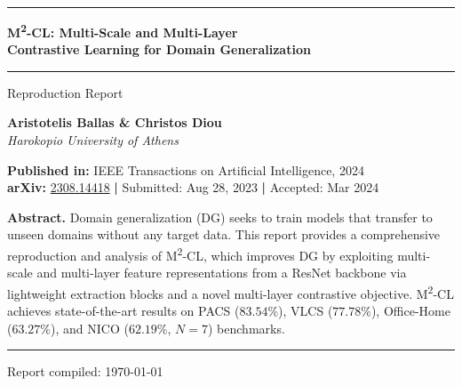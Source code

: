 \documentclass[12pt,a4paper]{article}
\begin{document}

\begin{titlepage}
  \centering
  \vspace*{1.5cm}

  {\color{DarkBlue}\rule{\textwidth}{2pt}}
  \vspace{0.5cm}

  {\huge\bfseries\color{DarkBlue}
    M\textsuperscript{2}-CL: Multi-Scale and Multi-Layer\\[6pt]
    Contrastive Learning for Domain Generalization}

  \vspace{0.3cm}
  {\color{MidBlue}\rule{\textwidth}{1pt}}

  \vspace{0.8cm}
  {\large\color{DarkGray} Reproduction Report}

  \vspace{1.2cm}

  {\large\bfseries Aristotelis Ballas \quad \& \quad Christos Diou}\\[4pt]
  {\normalsize\itshape Harokopio University of Athens}

  \vspace{1.2cm}

  \begin{tcolorbox}[width=0.82\textwidth,
    colback=LightBlue!25,colframe=MidBlue,
    left=10pt,right=10pt,top=8pt,bottom=8pt]
    \centering
    \textbf{Published in:} IEEE Transactions on Artificial Intelligence, 2024\\[4pt]
    \textbf{arXiv:} \href{https://arxiv.org/abs/2308.14418}{2308.14418}
    \quad\textbf{|}\quad
    Submitted: Aug 28, 2023
    \quad\textbf{|}\quad
    Accepted: Mar 2024
  \end{tcolorbox}

  \vspace{1.5cm}

  \begin{tcolorbox}[width=0.82\textwidth,
    colback=LightGray,colframe=DarkGray!50,
    left=10pt,right=10pt]
    \centering\small
    \textbf{Abstract.}\;
    Domain generalization (DG) seeks to train models that transfer to unseen domains
    without any target data. This report provides a comprehensive reproduction and
    analysis of M\textsuperscript{2}-CL, which improves DG by exploiting multi-scale
    and multi-layer feature representations from a ResNet backbone via lightweight
    extraction blocks and a novel multi-layer contrastive objective. M\textsuperscript{2}-CL
    achieves state-of-the-art results on PACS ($83.54\%$), VLCS ($77.78\%$),
    Office-Home ($63.27\%$), and NICO ($62.19\%$, $N{=}7$) benchmarks.
  \end{tcolorbox}

  \vfill
  {\color{DarkBlue}\rule{\textwidth}{2pt}}
  {\small\color{DarkGray} Report compiled: \today}
\end{titlepage}
\end{document}
